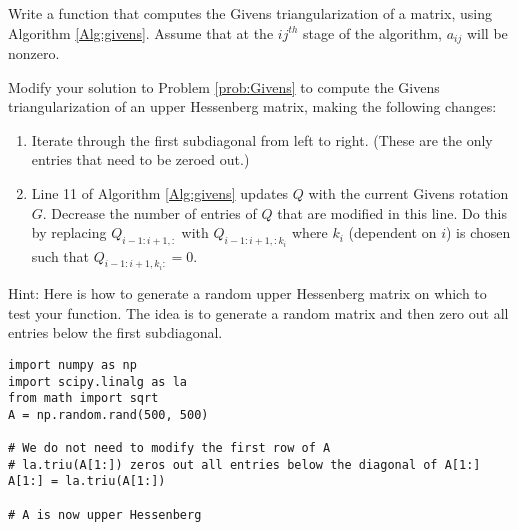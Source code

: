 \begin{problem}[Optional]
Write a function that computes the Givens triangularization of a matrix, using Algorithm \ref{Alg:givens}.
Assume that at the $ij^{th}$ stage of the algorithm, $a_{ij}$ will be nonzero.
\label{prob:Givens}
\end{problem}

\begin{problem}[Optional]
\label{prob:givens_hessenberg}
Modify your solution to Problem \ref{prob:Givens} to compute the Givens triangularization of an upper Hessenberg matrix, making the following changes:
\begin{enumerate}
    \item Iterate through the first subdiagonal from left to right. (These are the only entries that need to be zeroed out.)
    \item Line 11 of Algorithm \ref{Alg:givens} updates $Q$ with the current Givens rotation $G$. Decrease the number of entries of $Q$ that are modified in this line. Do this by replacing $Q_{i-1:i+1, :}$ with $Q_{i-1:i+1, :k_i}$ where $k_i$ (dependent on $i$) is chosen such that $Q_{i-1:i+1, k_i:}=0$. %
\end{enumerate}
Hint: Here is how to generate a random upper Hessenberg matrix on which to test your function.
The idea is to generate a random matrix and then zero out all entries below the first subdiagonal.

\begin{lstlisting}
import numpy as np
import scipy.linalg as la
from math import sqrt
A = np.random.rand(500, 500)

# We do not need to modify the first row of A
# la.triu(A[1:]) zeros out all entries below the diagonal of A[1:]
A[1:] = la.triu(A[1:])

# A is now upper Hessenberg
\end{lstlisting}

\begin{comment}
What is the computational order of  complexity for this problem?
Approximately for what $m$ is your implementation as fast as the general QR decomposition built in to \li{scipy.linalg} for computing the QR decomposition of an upper Hessenberg matrix?
\end{comment}
\end{problem}

